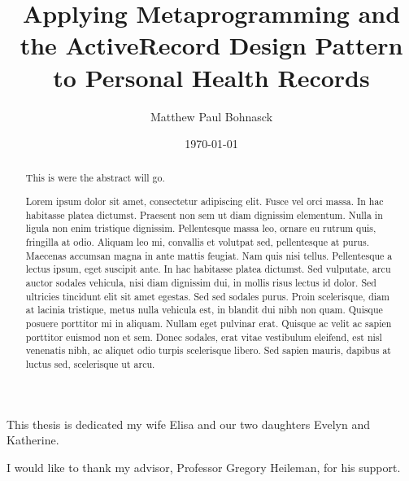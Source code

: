 \documentclass[botnum,fleqn,final]{unmeethesis}
\newcommand{\mytitle}{Applying Metaprogramming and the ActiveRecord Design Pattern to Personal Health Records}
\newcommand{\myauthor}{Matthew Paul Bohnasck}
\begin{document}
\frontmatter

\title{\mytitle}
\author{\myauthor}





\date{\today}

\maketitle

\makecopyright

\begin{dedication}
   This thesis is dedicated my wife Elisa and our two daughters Evelyn and Katherine.
\end{dedication}

\begin{acknowledgments}
   \vspace{1.1in}
   I would like to thank my advisor, Professor Gregory Heileman, for his support.
\end{acknowledgments}

\maketitleabstract

\begin{abstract}
This is were the abstract will go.

Lorem ipsum dolor sit amet, consectetur adipiscing elit. Fusce vel orci massa.
In hac habitasse platea dictumst. Praesent non sem ut diam dignissim elementum.
Nulla in ligula non enim tristique dignissim. Pellentesque massa leo, ornare eu
rutrum quis, fringilla at odio. Aliquam leo mi, convallis et volutpat sed,
pellentesque at purus. Maecenas accumsan magna in ante mattis feugiat. Nam quis
nisi tellus. Pellentesque a lectus ipsum, eget suscipit ante. In hac habitasse
platea dictumst. Sed vulputate, arcu auctor sodales vehicula, nisi diam
dignissim dui, in mollis risus lectus id dolor. Sed ultricies tincidunt elit
sit amet egestas. Sed sed sodales purus. Proin scelerisque, diam at lacinia
tristique, metus nulla vehicula est, in blandit dui nibh non quam. Quisque
posuere porttitor mi in aliquam. Nullam eget pulvinar erat. Quisque ac velit ac
sapien porttitor euismod non et sem. Donec sodales, erat vitae vestibulum
eleifend, est nisl venenatis nibh, ac aliquet odio turpis scelerisque libero.
Sed sapien mauris, dapibus at luctus sed, scelerisque ut arcu.

\clearpage %
\end{abstract}
\end{document}
